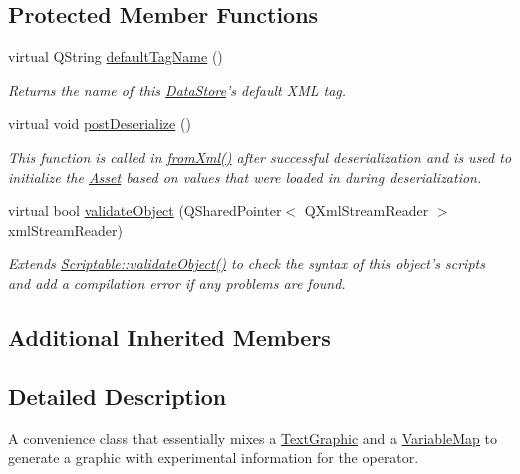 \subsection*{Protected Member Functions}
\begin{DoxyCompactItemize}
\item 
virtual Q\-String \hyperlink{class_picto_1_1_operator_info_graphic_a756efd8ba69d89e91584f98034c7fd12}{default\-Tag\-Name} ()
\begin{DoxyCompactList}\small\item\em Returns the name of this \hyperlink{class_picto_1_1_data_store}{Data\-Store}'s default X\-M\-L tag. \end{DoxyCompactList}\item 
virtual void \hyperlink{class_picto_1_1_operator_info_graphic_a0efe632b6c2aca2ec08c9321d60bd3b9}{post\-Deserialize} ()
\begin{DoxyCompactList}\small\item\em This function is called in \hyperlink{class_picto_1_1_asset_a8bed4da09ecb1c07ce0dab313a9aba67}{from\-Xml()} after successful deserialization and is used to initialize the \hyperlink{class_picto_1_1_asset}{Asset} based on values that were loaded in during deserialization. \end{DoxyCompactList}\item 
\hypertarget{class_picto_1_1_operator_info_graphic_ab297013765d250245728cc1c631006a3}{virtual bool \hyperlink{class_picto_1_1_operator_info_graphic_ab297013765d250245728cc1c631006a3}{validate\-Object} (Q\-Shared\-Pointer$<$ Q\-Xml\-Stream\-Reader $>$ xml\-Stream\-Reader)}\label{class_picto_1_1_operator_info_graphic_ab297013765d250245728cc1c631006a3}

\begin{DoxyCompactList}\small\item\em Extends \hyperlink{class_picto_1_1_scriptable_ab6e2944c43a3b5d418bf7b251594386d}{Scriptable\-::validate\-Object()} to check the syntax of this object's scripts and add a compilation error if any problems are found. \end{DoxyCompactList}\end{DoxyCompactItemize}
\subsection*{Additional Inherited Members}


\subsection{Detailed Description}
A convenience class that essentially mixes a \hyperlink{class_picto_1_1_text_graphic}{Text\-Graphic} and a \hyperlink{class_picto_1_1_variable_map}{Variable\-Map} to generate a graphic with experimental information for the operator. 

